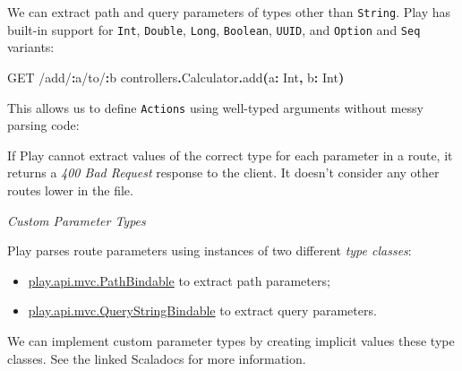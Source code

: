 \documentclass[oneside,11pt,a4paper,]{book}
\newenvironment{Shaded}{\begin{snugshade}}{\end{snugshade}}
\newcommand{\KeywordTok}[1]{\textcolor[rgb]{0.13,0.29,0.53}{\textbf{{#1}}}}
\newcommand{\StringTok}[1]{\textcolor[rgb]{0.31,0.60,0.02}{{#1}}}
\newcommand{\FunctionTok}[1]{\textcolor[rgb]{0.00,0.00,0.00}{{#1}}}
\newcommand{\NormalTok}[1]{{#1}}
\begin{document}
We can extract path and query parameters of types other than
\texttt{String}. Play has built-in support for \texttt{Int},
\texttt{Double}, \texttt{Long}, \texttt{Boolean}, \texttt{UUID}, and
\texttt{Option} and \texttt{Seq} variants:

\begin{Shaded}
\begin{Highlighting}[]
\NormalTok{GET }\StringTok{/add/}\KeywordTok{:}\NormalTok{a}\StringTok{/to/}\KeywordTok{:}\NormalTok{b controllers}\KeywordTok{.}\NormalTok{Calculator}\KeywordTok{.}\NormalTok{add}\KeywordTok{(}\NormalTok{a}\KeywordTok{:} \NormalTok{Int}\KeywordTok{,} \NormalTok{b}\KeywordTok{:} \NormalTok{Int}\KeywordTok{)}
\end{Highlighting}
\end{Shaded}

This allows us to define \texttt{Actions} using well-typed arguments
without messy parsing code:

\begin{Shaded}
\end{Shaded}

If Play cannot extract values of the correct type for each parameter in
a route, it returns a \emph{400 Bad Request} response to the client. It
doesn't consider any other routes lower in the file.

\begin{WarningCallout}

\emph{Custom Parameter Types}

Play parses route parameters using instances of two different \emph{type
classes}:

\begin{itemize}
\itemsep1pt\parskip0pt
\item
  \href{https://www.playframework.com/documentation/2.3.x/api/scala/index.html\#play.api.mvc.PathBindable}{play.api.mvc.PathBindable}
  to extract path parameters;
\item
  \href{https://www.playframework.com/documentation/2.3.x/api/scala/index.html\#play.api.mvc.QueryStringBindable}{play.api.mvc.QueryStringBindable}
  to extract query parameters.
\end{itemize}

We can implement custom parameter types by creating implicit values
these type classes. See the linked Scaladocs for more information.

\end{WarningCallout}
\end{document}
